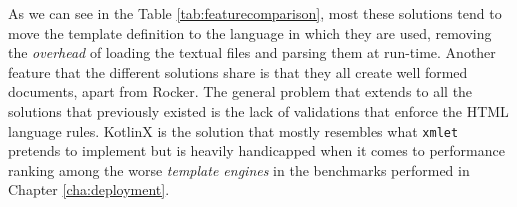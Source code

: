 \noindent
As we can see in the Table \ref{tab:featurecomparison}, most these solutions tend to move the template definition to the language in which they are used, removing the \textit{overhead} of loading the textual files and parsing them at run-time. Another feature that the different solutions share is that they all create well formed documents, apart from Rocker. The general problem that extends to all the solutions that previously existed is the lack of validations that enforce the \ac{HTML} language rules. KotlinX is the solution that mostly resembles what \texttt{xmlet} pretends to implement but is heavily handicapped when it comes to performance ranking among the worse \textit{template engines} in the benchmarks performed in Chapter \ref{cha:deployment}.